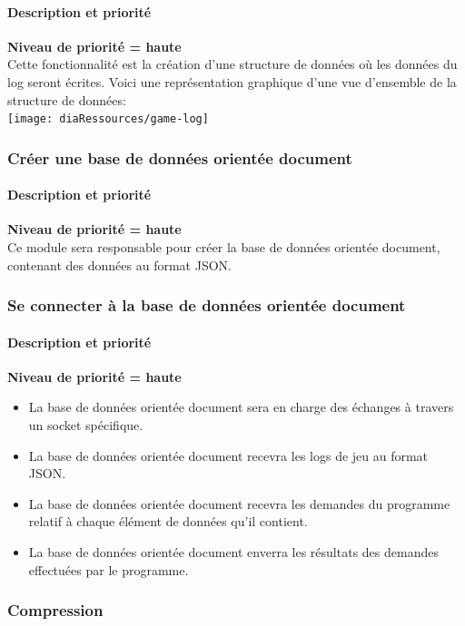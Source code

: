 \paragraph*{Description et priorité}
\textbf{Niveau de priorité = haute}\\
Cette fonctionnalité est la création d'une structure de données où les données du log seront écrites.
Voici une représentation graphique d'une vue d'ensemble de la structure de données:\\
\texttt{[image: diaRessources/game-log]}

\subsubsection{Créer une base de données orientée document }

\paragraph*{Description et priorité}
\textbf{Niveau de priorité = haute}\\
Ce module sera responsable pour créer la base de données orientée document, contenant des données au format JSON.
\subsubsection{Se connecter à la base de données orientée document }
\paragraph*{Description et priorité}
\textbf{Niveau de priorité = haute}\\
\begin{itemize}
\item La base de données orientée document sera en charge des échanges à travers un socket spécifique.
\item La base de données orientée document recevra les logs de jeu au format JSON.
\item La base de données orientée document recevra les demandes du programme relatif à chaque élément de données qu'il contient.
\item La base de données orientée document enverra les résultats des demandes effectuées par le programme.
\end{itemize}


\subsubsection{Compression}
